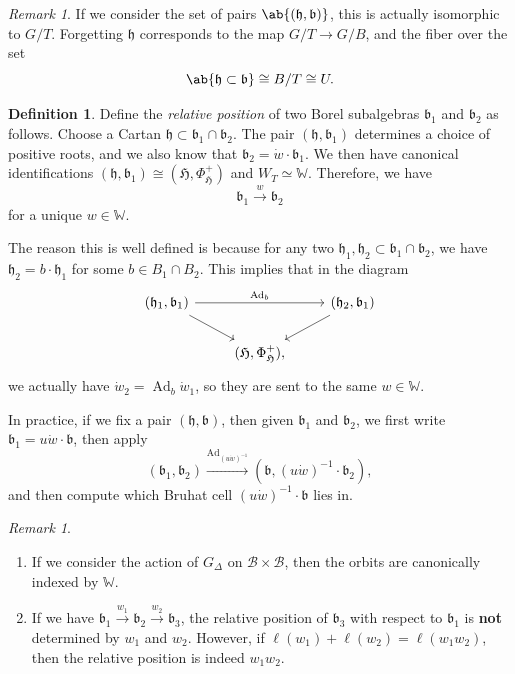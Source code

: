 \documentclass{amsart}
\theoremstyle{definition}
\newtheorem{defn}[thm]{Definition}
\theoremstyle{remark}
\newtheorem{rmk}[thm]{Remark}
\theoremstyle{plain}
\theoremstyle{definition}
\theoremstyle{remark}
\newcommand{\h}{\mathfrak{h}}
\renewcommand{\b}{\mathfrak{b}}
\newcommand{\mc}[1]{\mathcal{#1}}
\newcommand{\mf}[1]{\mathfrak{#1}}
\newcommand{\mbb}[1]{\mathbb{#1}}
\newcommand{\1}{\mathbf{1}}
\newcommand{\2}{\mathbf{2}}
\newcommand{\3}{\mathbf{3}}
\DeclareMathOperator{\Ad}{Ad}
\begin{document}
\begin{rmk}
    If we consider the set of pairs \(\ab\{ (\h, \b)\}\), this is actually isomorphic to \(G/T\). Forgetting \(\h\) corresponds to the map \(G/T \to G/B\), and the fiber over the set 
    \[ \ab\{ \h \subset \b \} \cong B/T \cong U. \]
\end{rmk}

\begin{defn}
    Define the \textit{relative position} of two Borel subalgebras \(\b_1\) and \(\b_2\) as follows. Choose a Cartan \(\h \subset \b_1 \cap \b_2\). The pair \((\h, \b_1)\) determines a choice of positive roots, and we also know that \(\b_2 = \dot{w} \cdot \b_1\). We then have canonical identifications \((\h, \b_1) \cong (\mf{H}, \Phi_{\mf{H}}^+)\) and \(W_T \simeq \mbb{W}\). Therefore, we have
    \[ \b_1 \xrightarrow{w} \b_2 \]
    for a unique \(w \in \mbb{W}\). 
    
    The reason this is well defined is because for any two \(\h_1, \h_2 \subset \b_1 \cap \b_2\), we have \(\h_2 = b \cdot \h_1\) for some \(b \in B_1 \cap B_2\). This implies that in the diagram
    \begin{equation*}
    \begin{tikzcd}
        (\h_1, \b_1) \ar{rr}{\Ad_b} \ar{dr} & & (\h_2, \b_1) \ar{dl} \\
        & (\mf{H}, \Phi^+_{\mf{H}}),
    \end{tikzcd}
    \end{equation*}
    we actually have \(\dot{w}_2 = \Ad_b \dot{w}_1\), so they are sent to the same \(w \in \mbb{W}\).
\end{defn}

In practice, if we fix a pair \((\h, \b)\), then given \(\b_1\) and \(\b_2\), we first write \(\b_1 = u \dot{w} \cdot \b\), then apply
\[ (\b_1, \b_2) \xrightarrow{\Ad_{(u \dot{w})^{-1}}} (\b, (u \dot{w})^{-1} \cdot \b_2), \]
and then compute which Bruhat cell \((u \dot{w})^{-1} \cdot \b\) lies in.

\begin{rmk}\leavevmode
    \begin{enumerate}
        \item If we consider the action of \(G_{\Delta}\) on \(\mc{B} \times \mc{B}\), then the orbits are canonically indexed by \(\mbb{W}\).
        \item If we have \(\b_1 \xrightarrow{w_1} \b_2 \xrightarrow{w_2} \b_3\), the relative position of \(\b_3\) with respect to \(\b_1\) is \textbf{not} determined by \(w_1\) and \(w_2\). However, if \(\ell(w_1) + \ell(w_2) = \ell(w_1 w_2)\), then the relative position is indeed \(w_1 w_2\).
    \end{enumerate}    
\end{rmk}
\end{document}
